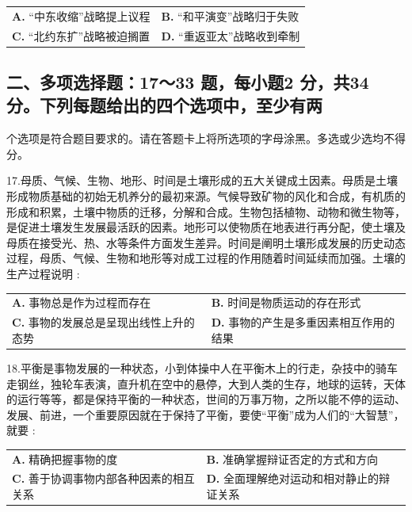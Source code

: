 \documentclass[UTF8,11pt]{ctexart}
\begin{document}
\begin{center}\begin{tabular}{>{\raggedright\arraybackslash}p{\dimexpr(\linewidth-4\tabcolsep)/2\relax}>{\raggedright\arraybackslash}p{\dimexpr(\linewidth-4\tabcolsep)/2\relax}}
\textbf{A.} “中东收缩”战略提上议程 & \textbf{B.} “和平演变”战略归于失败\\[.35em]
\textbf{C.} “北约东扩”战略被迫搁置 & \textbf{D.} “重返亚太”战略收到牵制\\[.35em]\end{tabular}\end{center}

\subsection*{二、多项选择题：17～33 题，每小题2 分，共34 分。下列每题给出的四个选项中，至少有两}

个选项是符合题目要求的。请在答题卡上将所选项的字母涂黑。多选或少选均不得分。


17.母质、气候、生物、地形、时间是土壤形成的五大关键成土因素。母质是土壤形成物质基础的初始无机养分的最初来源。气候导致矿物的风化和合成，有机质的形成和积累，土壤中物质的迁移，分解和合成。生物包括植物、动物和微生物等，是促进土壤发生发展最活跃的因素。地形可以使物质在地表进行再分配，使土壤及母质在接受光、热、水等条件方面发生差异。时间是阐明土壤形成发展的历史动态过程，母质、气候、生物和地形等对成工过程的作用随着时间延续而加强。土壤的生产过程说明 :


\begin{center}\begin{tabular}{>{\raggedright\arraybackslash}p{\dimexpr(\linewidth-4\tabcolsep)/2\relax}>{\raggedright\arraybackslash}p{\dimexpr(\linewidth-4\tabcolsep)/2\relax}}
\textbf{A.} 事物总是作为过程而存在 & \textbf{B.} 时间是物质运动的存在形式\\[.35em]
\textbf{C.} 事物的发展总是呈现出线性上升的态势 & \textbf{D.} 事物的产生是多重因素相互作用的结果\\[.35em]\end{tabular}\end{center}

18.平衡是事物发展的一种状态，小到体操中人在平衡木上的行走，杂技中的骑车走钢丝，独轮车表演，直升机在空中的悬停，大到人类的生存，地球的运转，天体的运行等等，都是保持平衡的一种状态，世间的万事万物，之所以能不停的运动、发展、前进，一个重要原因就在于保持了平衡，要使“平衡”成为人们的“大智慧”，就要 :


\begin{center}\begin{tabular}{>{\raggedright\arraybackslash}p{\dimexpr(\linewidth-4\tabcolsep)/2\relax}>{\raggedright\arraybackslash}p{\dimexpr(\linewidth-4\tabcolsep)/2\relax}}
\textbf{A.} 精确把握事物的度 & \textbf{B.} 准确掌握辩证否定的方式和方向\\[.35em]
\textbf{C.} 善于协调事物内部各种因素的相互关系 & \textbf{D.} 全面理解绝对运动和相对静止的辩证关系\\[.35em]\end{tabular}\end{center}
\end{document}
